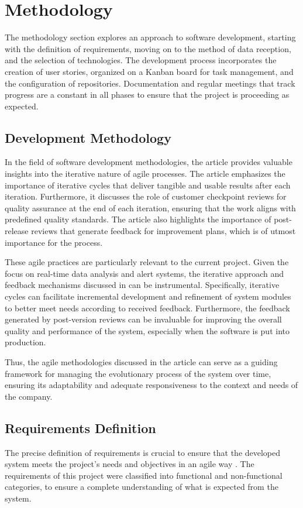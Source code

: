\chapter{Methodology}\label{cap:metodology}
The methodology section explores an approach to software development, starting with the definition of requirements, moving on to the method of data reception, and the selection of technologies. The development process incorporates the creation of user stories, organized on a Kanban board for task management, and the configuration of repositories. Documentation and regular meetings that track progress are a constant in all phases to ensure that the project is proceeding as expected.

\section{Development Methodology}
In the field of software development methodologies, the article \cite{shankarmani2012agile} provides valuable insights into the iterative nature of agile processes. The article emphasizes the importance of iterative cycles that deliver tangible and usable results after each iteration. Furthermore, it discusses the role of customer checkpoint reviews for quality assurance at the end of each iteration, ensuring that the work aligns with predefined quality standards. The article also highlights the importance of post-release reviews that generate feedback for improvement plans, which is of utmost importance for the process.

These agile practices are particularly relevant to the current project. Given the focus on real-time data analysis and alert systems, the iterative approach and feedback mechanisms discussed in \cite{shankarmani2012agile} can be instrumental. Specifically, iterative cycles can facilitate incremental development and refinement of system modules to better meet needs according to received feedback. Furthermore, the feedback generated by post-version reviews can be invaluable for improving the overall quality and performance of the system, especially when the software is put into production.

Thus, the agile methodologies discussed in the article can serve as a guiding framework for managing the evolutionary process of the system over time, ensuring its adaptability and adequate responsiveness to the context and needs of the company.

\section[Requirements Definition]{Requirements Definition}\label{sec:req}
The precise definition of requirements is crucial to ensure that the developed system meets the project's needs and objectives in an agile way \cite{asghar2016role}. The requirements of this project were classified into functional and non-functional categories, to ensure a complete understanding of what is expected from the system.


